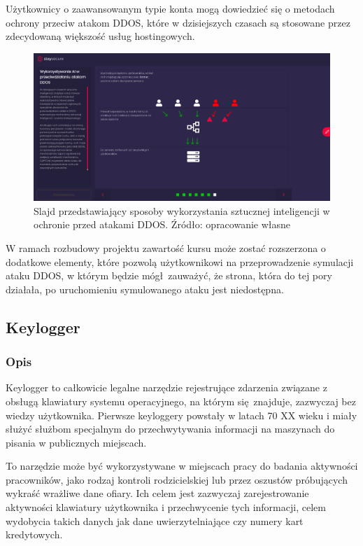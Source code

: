\documentclass[12pt,twoside]{article}
\begin{document}
Użytkownicy o zaawansowanym typie konta mogą dowiedzieć się o metodach ochrony przeciw atakom DDOS, które w dzisiejszych czasach są stosowane przez zdecydowaną większość usług hostingowych. 

\begin{figure}[H]
	\centering
	\includegraphics[width=1\linewidth]{figures/dos-slide-screenshot3}
	\caption{Slajd przedstawiający sposoby wykorzystania sztucznej inteligencji w ochronie przed atakami DDOS. Źródło: opracowanie własne}
\end{figure}


W ramach rozbudowy projektu zawartość kursu może zostać rozszerzona o dodatkowe elementy, które pozwolą użytkownikowi na przeprowadzenie symulacji ataku DDOS, w którym będzie mógł zauważyć, że strona, która do tej pory działała, po uruchomieniu symulowanego ataku jest niedostępna.
 
\clearpage


\subsection{Keylogger}
\subsubsection{Opis}
Keylogger to całkowicie legalne narzędzie rejestrujące zdarzenia związane z obsługą klawiatury systemu operacyjnego, na którym się znajduje, zazwyczaj bez wiedzy użytkownika. Pierwsze keyloggery powstały w latach 70 XX wieku i miały służyć służbom specjalnym do przechwytywania informacji na maszynach do pisania w publicznych miejscach.

To narzędzie może być wykorzystywane w miejscach pracy do badania aktywności pracowników, jako rodzaj kontroli rodzicielskiej lub przez oszustów próbujących wykraść wrażliwe dane ofiary. Ich celem jest zazwyczaj zarejestrowanie aktywności klawiatury użytkownika i przechwycenie tych informacji, celem wydobycia takich danych jak dane uwierzytelniające czy numery kart kredytowych.
\end{document}

